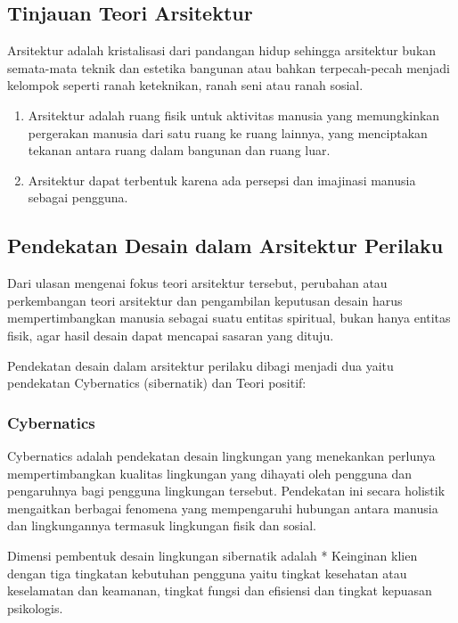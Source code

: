 \documentclass[../manperil.tex]{subfiles}
\begin{document}
\subsection{Tinjauan Teori Arsitektur}%
\label{sub:tinjauan_teori_arsitektur}

Arsitektur adalah kristalisasi dari pandangan hidup sehingga arsitektur bukan semata-mata teknik dan estetika bangunan atau bahkan terpecah-pecah menjadi kelompok seperti ranah keteknikan, ranah seni atau ranah sosial.

\begin{enumerate}
	\item Arsitektur adalah ruang fisik untuk aktivitas manusia yang memungkinkan pergerakan manusia dari satu ruang ke ruang lainnya, yang menciptakan tekanan antara ruang dalam bangunan dan ruang luar.
	\item Arsitektur dapat terbentuk karena ada persepsi dan imajinasi manusia sebagai pengguna.
\end{enumerate}

\subsection{Pendekatan Desain dalam Arsitektur Perilaku}%
\label{sub:pendekatan_desain_dalam_arsitektur_perilaku}

Dari ulasan mengenai fokus teori arsitektur tersebut, perubahan atau perkembangan teori arsitektur dan pengambilan keputusan desain harus mempertimbangkan manusia sebagai suatu entitas spiritual, bukan hanya entitas fisik, agar hasil desain dapat mencapai sasaran yang dituju.

Pendekatan desain dalam arsitektur perilaku dibagi menjadi dua yaitu pendekatan Cybernatics (sibernatik) dan Teori positif:

\subsubsection{Cybernatics}%
\label{ssub:cybernatics}

Cybernatics adalah pendekatan desain lingkungan yang menekankan perlunya mempertimbangkan kualitas lingkungan yang dihayati oleh pengguna dan pengaruhnya bagi pengguna lingkungan tersebut. Pendekatan ini secara holistik mengaitkan berbagai fenomena yang mempengaruhi hubungan antara manusia dan lingkungannya termasuk lingkungan fisik dan sosial.

Dimensi pembentuk desain lingkungan sibernatik adalah * Keinginan klien dengan tiga tingkatan kebutuhan pengguna yaitu tingkat kesehatan atau keselamatan dan keamanan, tingkat fungsi dan efisiensi dan tingkat kepuasan psikologis.
\end{document}
